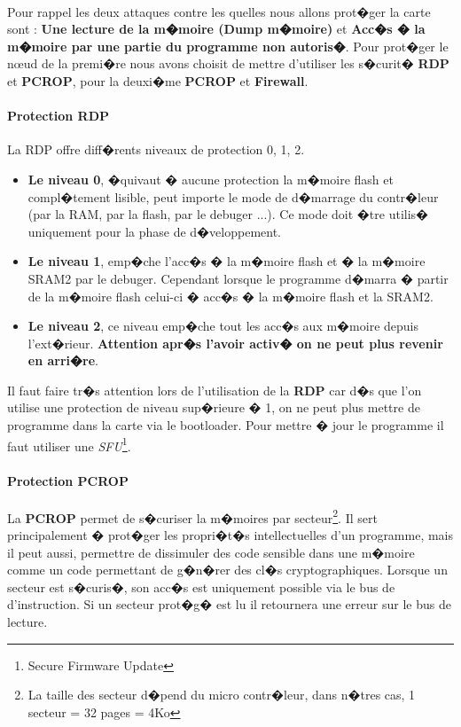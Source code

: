 \documentclass[a4paper, titlepage,12pt]{report}
\begin{document}
\paragraph{}
Pour rappel les deux attaques contre les quelles nous allons prot�ger la carte sont : \textbf{Une lecture de la m�moire (Dump m�moire)} et \textbf{Acc�s � la m�moire par une partie du programme non autoris�}. Pour prot�ger le n\oe{}ud de la premi�re nous avons choisit de mettre d'utiliser les s�curit� \textbf{RDP} et \textbf{PCROP}, pour la deuxi�me \textbf{PCROP} et \textbf{Firewall}.

\paragraph{Protection RDP}
La RDP offre diff�rents niveaux de protection 0, 1, 2.

\begin{itemize}
\item \textbf{Le niveau 0}, �quivaut � aucune protection la m�moire flash et compl�tement lisible, peut importe le mode de d�marrage du contr�leur (par la RAM, par la flash, par le debuger ...). Ce mode doit �tre utilis� uniquement pour la phase de d�veloppement.

\item \textbf{Le niveau 1}, emp�che l'acc�s � la m�moire flash et � la m�moire SRAM2 par le debuger. Cependant lorsque le programme d�marra � partir de la m�moire flash celui-ci � acc�s � la m�moire flash et la SRAM2.

\item \textbf{Le niveau 2}, ce niveau emp�che tout les acc�s aux m�moire depuis l'ext�rieur. \textbf{Attention apr�s l'avoir activ� on ne peut plus revenir en arri�re}.

\end{itemize}

Il faut faire tr�s attention lors de l'utilisation de la \textbf{RDP} car d�s que l'on utilise une protection de niveau sup�rieure � 1, on ne peut plus mettre de programme dans la carte via le bootloader.
Pour mettre � jour le programme il faut utiliser une \textit{SFU}\footnote{Secure Firmware Update}.

\paragraph{Protection PCROP}
La \textbf{PCROP} permet de s�curiser la m�moires par secteur\footnote{La taille des secteur d�pend du micro contr�leur, dans n�tres cas, 1 secteur = 32 pages = 4Ko}. Il sert principalement � prot�ger les propri�t�s intellectuelles d'un programme, mais il peut aussi, permettre de dissimuler des code sensible dans une m�moire comme un code permettant de g�n�rer des cl�s cryptographiques. Lorsque un secteur est s�curis�, son acc�s est uniquement possible via le bus de d'instruction. Si un secteur prot�g� est lu il retournera une erreur sur le bus de lecture.
\end{document}
